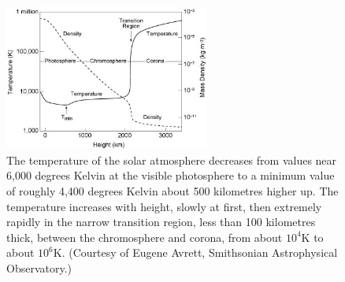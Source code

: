 \begin{figure}[H]
  \begin{center}
    \includegraphics[width=0.6\textwidth]{solar-atm-plot}
\caption{The temperature of the solar atmosphere decreases from values near 6,000 degrees Kelvin at the visible photosphere to a minimum value of roughly 4,400 degrees Kelvin about 500 kilometres higher up. The temperature increases with height, slowly at first, then extremely rapidly in the narrow transition region, less than 100 kilometres thick, between the chromosphere and corona, from about $10^{4}$K to about $10^{6}$K. (Courtesy of Eugene Avrett, Smithsonian Astrophysical Observatory.)}\label{solatm}
  \end{center}
\end{figure}


